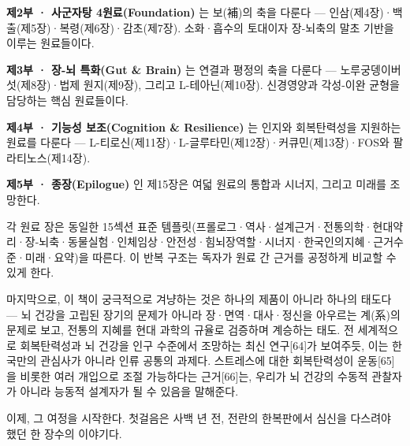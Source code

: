 \documentclass[11pt,oneside]{book}
\begin{document}
\textbf{제2부 · 사군자탕 4원료(Foundation)} 는 보(補)의 축을 다룬다 — 인삼(제4장)·백출(제5장)·복령(제6장)·감초(제7장). 소화·흡수의 토대이자 장-뇌축의 말초 기반을 이루는 원료들이다.

\textbf{제3부 · 장-뇌 특화(Gut \& Brain)} 는 연결과 평정의 축을 다룬다 — 노루궁뎅이버섯(제8장)·법제 원지(제9장), 그리고 L-테아닌(제10장). 신경영양과 각성-이완 균형을 담당하는 핵심 원료들이다.

\textbf{제4부 · 기능성 보조(Cognition \& Resilience)} 는 인지와 회복탄력성을 지원하는 원료를 다룬다 — L-티로신(제11장)·L-글루타민(제12장)·커큐민(제13장)·FOS와 팔라티노스(제14장).

\textbf{제5부 · 종장(Epilogue)} 인 제15장은 여덟 원료의 통합과 시너지, 그리고 미래를 조망한다.

각 원료 장은 동일한 15섹션 표준 템플릿(프롤로그·역사·설계근거·전통의학·현대약리·장-뇌축·동물실험·인체임상·안전성·힘뇌장역할·시너지·한국인의지혜·근거수준·미래·요약)을 따른다. 이 반복 구조는 독자가 원료 간 근거를 공정하게 비교할 수 있게 한다.

마지막으로, 이 책이 궁극적으로 겨냥하는 것은 하나의 제품이 아니라 하나의 태도다 — 뇌 건강을 고립된 장기의 문제가 아니라 장·면역·대사·정신을 아우르는 계(系)의 문제로 보고, 전통의 지혜를 현대 과학의 규율로 검증하며 계승하는 태도. 전 세계적으로 회복탄력성과 뇌 건강을 인구 수준에서 조망하는 최신 연구[64]가 보여주듯, 이는 한국만의 관심사가 아니라 인류 공통의 과제다. 스트레스에 대한 회복탄력성이 운동[65]을 비롯한 여러 개입으로 조절 가능하다는 근거[66]는, 우리가 뇌 건강의 수동적 관찰자가 아니라 능동적 설계자가 될 수 있음을 말해준다.

이제, 그 여정을 시작한다. 첫걸음은 사백 년 전, 전란의 한복판에서 심신을 다스려야 했던 한 장수의 이야기다.
\end{document}
